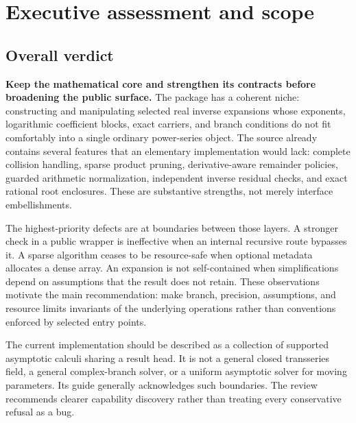 \section{Executive assessment and scope}
\subsection{Overall verdict}
\textbf{Keep the mathematical core and strengthen its contracts before broadening the public surface.} The package has a coherent niche: constructing and manipulating selected real inverse expansions whose exponents, logarithmic coefficient blocks, exact carriers, and branch conditions do not fit comfortably into a single ordinary power-series object. The source already contains several features that an elementary implementation would lack: complete collision handling, sparse product pruning, derivative-aware remainder policies, guarded arithmetic normalization, independent inverse residual checks, and exact rational root enclosures. These are substantive strengths, not merely interface embellishments.\cite{core,operations,arithmetic,incremental,certificates}

The highest-priority defects are at boundaries between those layers. A stronger check in a public wrapper is ineffective when an internal recursive route bypasses it. A sparse algorithm ceases to be resource-safe when optional metadata allocates a dense array. An expansion is not self-contained when simplifications depend on assumptions that the result does not retain. These observations motivate the main recommendation: make branch, precision, assumptions, and resource limits invariants of the underlying operations rather than conventions enforced by selected entry points.

The current implementation should be described as a collection of supported asymptotic calculi sharing a result head. It is not a general closed transseries field, a general complex-branch solver, or a uniform asymptotic solver for moving parameters. Its guide generally acknowledges such boundaries. The review recommends clearer capability discovery rather than treating every conservative refusal as a bug.\cite{guide,core,sourcecharts,inverseexpressions,native}

